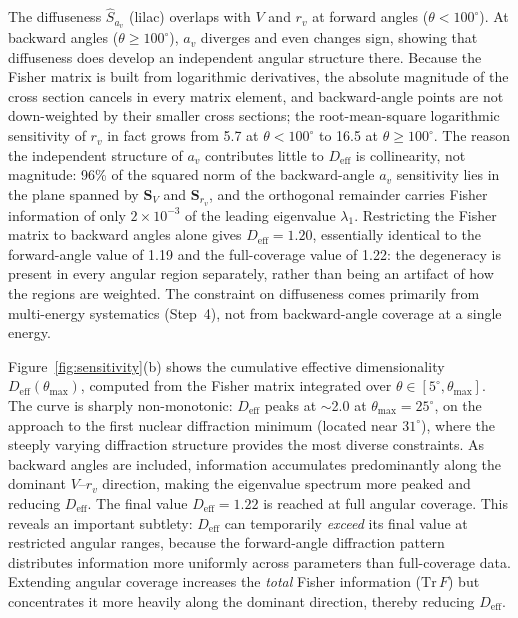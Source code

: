 \documentclass[aps,prl,reprint,superscriptaddress,showpacs,floatfix]{revtex4-2}
\begin{document}
The diffuseness $\hat{S}_{a_v}$ (lilac) overlaps with $V$ and $r_v$ at forward angles ($\theta < 100^\circ$). At backward angles ($\theta \geq 100^\circ$), $a_v$ diverges and even changes sign, showing that diffuseness does develop an independent angular structure there. Because the Fisher matrix is built from logarithmic derivatives, the absolute magnitude of the cross section cancels in every matrix element, and backward-angle points are not down-weighted by their smaller cross sections; the root-mean-square logarithmic sensitivity of $r_v$ in fact grows from 5.7 at $\theta < 100^\circ$ to 16.5 at $\theta \geq 100^\circ$. The reason the independent structure of $a_v$ contributes little to $D_\mathrm{eff}$ is collinearity, not magnitude: 96\% of the squared norm of the backward-angle $a_v$ sensitivity lies in the plane spanned by $\mathbf{S}_V$ and $\mathbf{S}_{r_v}$, and the orthogonal remainder carries Fisher information of only $2\times10^{-3}$ of the leading eigenvalue $\lambda_1$. Restricting the Fisher matrix to backward angles alone gives $D_\mathrm{eff} = 1.20$, essentially identical to the forward-angle value of 1.19 and the full-coverage value of 1.22: the degeneracy is present in every angular region separately, rather than being an artifact of how the regions are weighted. The constraint on diffuseness comes primarily from multi-energy systematics (Step~4), not from backward-angle coverage at a single energy.

Figure~\ref{fig:sensitivity}(b) shows the cumulative effective dimensionality $D_\mathrm{eff}(\theta_\mathrm{max})$, computed from the Fisher matrix integrated over $\theta \in [5^\circ, \theta_\mathrm{max}]$. The curve is sharply non-monotonic: $D_\mathrm{eff}$ peaks at $\sim$2.0 at $\theta_\mathrm{max} = 25^\circ$, on the approach to the first nuclear diffraction minimum (located near $31^\circ$), where the steeply varying diffraction structure provides the most diverse constraints. As backward angles are included, information accumulates predominantly along the dominant $V$--$r_v$ direction, making the eigenvalue spectrum more peaked and reducing $D_\mathrm{eff}$. The final value $D_\mathrm{eff} = 1.22$ is reached at full angular coverage. This reveals an important subtlety: $D_\mathrm{eff}$ can temporarily \emph{exceed} its final value at restricted angular ranges, because the forward-angle diffraction pattern distributes information more uniformly across parameters than full-coverage data. Extending angular coverage increases the \emph{total} Fisher information ($\mathrm{Tr}\,F$) but concentrates it more heavily along the dominant direction, thereby reducing $D_\mathrm{eff}$.
\end{document}
